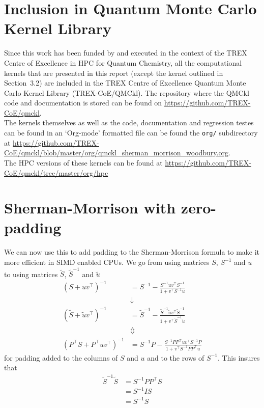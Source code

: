 \documentclass[11pt]{article}
\numberwithin{figure}{section}
\numberwithin{table}{section}
\begin{document}
  \section{Inclusion in Quantum Monte Carlo Kernel Library}
    Since this work has been funded by and executed in the context of the TREX Centre of Excellence in HPC for Quantum Chemistry, all the computational kernels that are presented in this report (except the kernel outlined in Section~3.2) are included in the TREX Centre of Excellence Quantum Monte Carlo Kernel Library (TREX-CoE/QMCkl). The repository where the QMCkl code and documentation is stored can be found on \url{https://github.com/TREX-CoE/qmckl}.\\
    
    The kernels themselves as well as the code, documentation and regression testes can be found in an `Org-mode' formatted file can be found the \texttt{org/} subdirectory at \url{https://github.com/TREX-CoE/qmckl/blob/master/org/qmckl_sherman_morrison_woodbury.org}.\\
    
    The HPC versions of these kernels can be found at \url{https://github.com/TREX-CoE/qmckl/tree/master/org/hpc}

  \newpage
  \appendix

\section{Sherman-Morrison with zero-padding}

We can now use this to add padding to the Sherman-Morrison formula to make it more efficient in SIMD enabled CPUs. We go from using matrices $S$, $S^{-1}$ and $u$ to using matrices $\widetilde{S}$, $\widetilde{S}^{-1}$ and $\widetilde{u}$
\begin{align}
	\left(S+uv^\top \right)^{-1} &= S^{-1}-\frac{S^{-1}uv^\top S^{-1}}{1+v^\top S^{-1}u} \\
								&\downarrow \\
	\left(\widetilde{S}+\widetilde{u}v^\top \right)^{-1} &= \widetilde{S}^{-1}-\frac{\widetilde{S}^{-1}\widetilde{u}v^\top \widetilde{S}^{-1}}{1+v^\top \widetilde{S}^{-1}\widetilde{u}} \\
								&\Updownarrow \\
	\left(P^\top S+P^\top uv^\top \right)^{-1} &= S^{-1}P-\frac{S^{-1}PP^\top uv^\top S^{-1}P}{1+v^\top S^{-1}PP^\top u}	
\end{align}
for padding added to the columns of $S$ and $u$ and to the rows of $S^{-1}$. This insures that
\begin{align}
	\widetilde{S}^{-1}\widetilde{S} &= S^{-1}PP^\top S \\
									&= S^{-1}IS \\
									&= S^{-1}S
\end{align}
\end{document}
